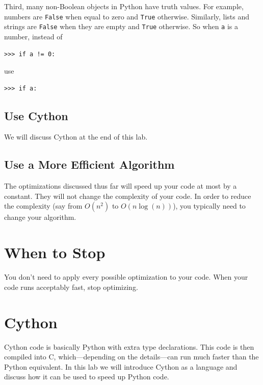 Third, many non-Boolean objects in Python have truth values.
For example, numbers are \texttt{False} when equal to zero and \texttt{True} otherwise.
Similarly, lists and strings are \texttt{False} when they are empty and \texttt{True} otherwise.
So when \texttt{a} is a number, instead of
\begin{lstlisting}
>>> if a != 0:
\end{lstlisting}
use
\begin{lstlisting}
>>> if a:
\end{lstlisting}
\subsection*{Use Cython}
We will discuss Cython at the end of this lab.

\subsection*{Use a More Efficient Algorithm}
The optimizations discussed thus far will speed up your code at most by a constant.
They will not change the complexity of your code.
In order to reduce the complexity (say from $O(n^2)$ to $O(n \log(n))$), you typically need to change your algorithm.









\section*{When to Stop}
You don't need to apply every possible optimization to your code.
When your code runs acceptably fast, stop optimizing.



\section*{Cython}
Cython code is basically Python with extra type declarations.
This code is then compiled into C, which---depending on the details---can run much faster than the Python equivalent.
In this lab we will introduce Cython as a language and discuss how it can be used to speed up Python code.

